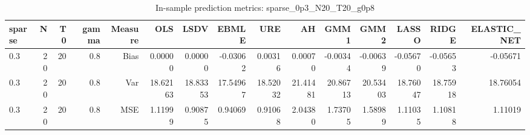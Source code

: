 \begin{table}[!htbp]\centering
\caption{In-sample prediction metrics: sparse_0p3_N20_T20_g0p8}
\label{tab:table2_sparse_0p3_N20_T20_g0p8}
\begin{tabular}{lrrrrrrrrrrrrrr}
\hline
sparse & N & T0 & gamma & Measure & OLS & LSDV & EBMLE & URE & AH & GMM1 & GMM2 & LASSO & RIDGE & ELASTIC_NET \\
\hline
0.3 & 20 & 20 & 0.8 & Bias & 0.00000 & 0.00000 & -0.03062 & 0.00316 & 0.00070 & -0.00344 & -0.00639 & -0.05670 & -0.05653 & -0.05671 \\
0.3 & 20 & 20 & 0.8 & Var & 18.62163 & 18.83353 & 17.54967 & 18.52032 & 21.41481 & 20.86713 & 20.53403 & 18.76047 & 18.75918 & 18.76054 \\
0.3 & 20 & 20 & 0.8 & MSE & 1.11999 & 0.90875 & 0.94069 & 0.91068 & 2.04380 & 1.73705 & 1.58989 & 1.11035 & 1.10818 & 1.11019 \\
\hline
\end{tabular}
\end{table}

